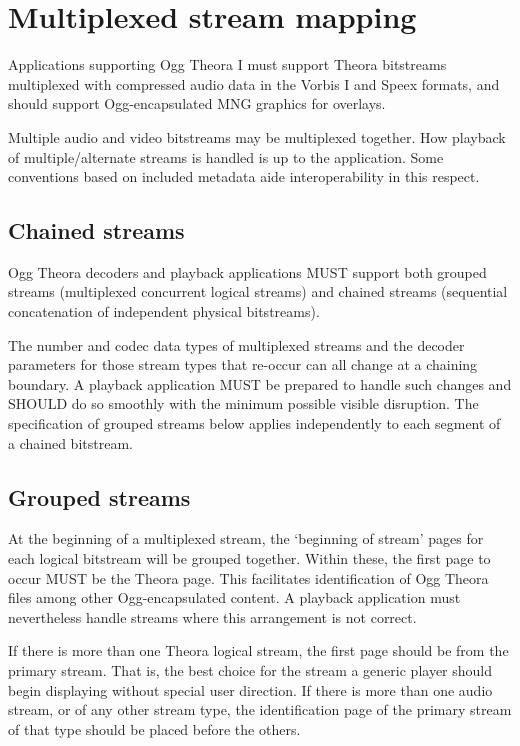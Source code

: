 \documentclass[11pt,letterpaper]{book}
\numberwithin{equation}{chapter}
\numberwithin{figure}{chapter}
\numberwithin{table}{chapter}
\begin{document}
\section{Multiplexed stream mapping}

Applications supporting Ogg Theora I must support Theora bitstreams
 multiplexed with compressed audio data in the Vorbis I and Speex
 formats, and should support Ogg-encapsulated MNG graphics for overlays.

Multiple audio and video bitstreams may be multiplexed together.
How playback of multiple/alternate streams is handled is up to the
 application.
Some conventions based on included metadata aide interoperability
 in this respect.

\subsection{Chained streams}

Ogg Theora decoders and playback applications MUST support both grouped
 streams (multiplexed concurrent logical streams) and chained streams
 (sequential concatenation of independent physical bitstreams).

The number and codec data types of multiplexed streams and the decoder
 parameters for those stream types that re-occur can all change at a
 chaining boundary.
A playback application MUST be prepared to handle such changes and
 SHOULD do so smoothly with the minimum possible visible disruption.
The specification of grouped streams below applies independently to each
 segment of a chained bitstream.

\subsection{Grouped streams}

At the beginning of a multiplexed stream, the `beginning of stream'
 pages for each logical bitstream will be grouped together.
Within these, the first page to occur MUST be the Theora page.
This facilitates identification of Ogg Theora files among other
 Ogg-encapsulated content.
A playback application must nevertheless handle streams where this
 arrangement is not correct.

If there is more than one Theora logical stream, the first page should
 be from the primary stream.
That is, the best choice for the stream a generic player should begin
 displaying without special user direction.
If there is more than one audio stream, or of any other stream
 type, the identification page of the primary stream of that type
 should be placed before the others.
\end{document}
